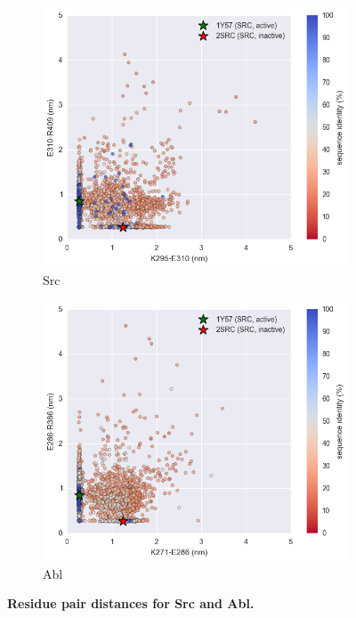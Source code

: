 \documentclass[aps,pre,twocolumn,nofootinbib,superscriptaddress,linenumbers]{revtex4-1}
\begin{document}
\begin{figure}
  \centering
    \begin{subfigure}[b]{0.45\textwidth}
      \includegraphics[width=1.0\textwidth]{residue_pair_distances/src/distances}
      \caption{Src}
    \end{subfigure}
    \begin{subfigure}[b]{0.45\textwidth}
      \includegraphics[width=1.0\textwidth]{residue_pair_distances/abl/distances}
      \caption{Abl}
    \end{subfigure}
    \caption{{\bf Residue pair distances for Src and Abl.}
  }
  \label{figaa_pair_distances_ref_structures}
\end{figure}
\end{document}
